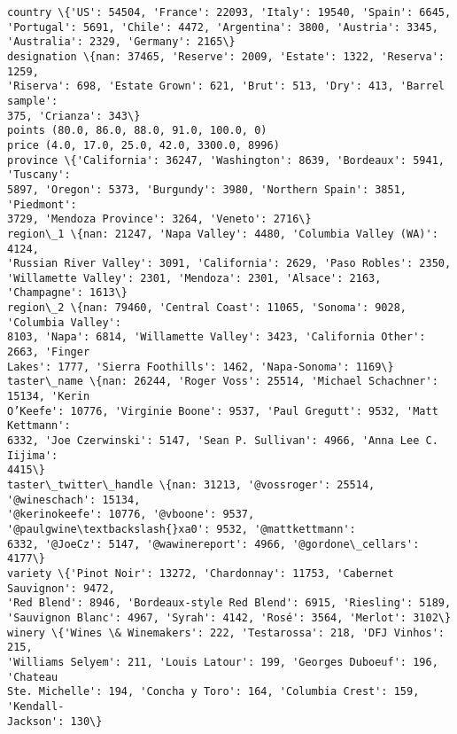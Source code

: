 \documentclass[11pt]{article}
\begin{document}
    \begin{Verbatim}[commandchars=\\\{\}]
country \{'US': 54504, 'France': 22093, 'Italy': 19540, 'Spain': 6645,
'Portugal': 5691, 'Chile': 4472, 'Argentina': 3800, 'Austria': 3345,
'Australia': 2329, 'Germany': 2165\}
designation \{nan: 37465, 'Reserve': 2009, 'Estate': 1322, 'Reserva': 1259,
'Riserva': 698, 'Estate Grown': 621, 'Brut': 513, 'Dry': 413, 'Barrel sample':
375, 'Crianza': 343\}
points (80.0, 86.0, 88.0, 91.0, 100.0, 0)
price (4.0, 17.0, 25.0, 42.0, 3300.0, 8996)
province \{'California': 36247, 'Washington': 8639, 'Bordeaux': 5941, 'Tuscany':
5897, 'Oregon': 5373, 'Burgundy': 3980, 'Northern Spain': 3851, 'Piedmont':
3729, 'Mendoza Province': 3264, 'Veneto': 2716\}
region\_1 \{nan: 21247, 'Napa Valley': 4480, 'Columbia Valley (WA)': 4124,
'Russian River Valley': 3091, 'California': 2629, 'Paso Robles': 2350,
'Willamette Valley': 2301, 'Mendoza': 2301, 'Alsace': 2163, 'Champagne': 1613\}
region\_2 \{nan: 79460, 'Central Coast': 11065, 'Sonoma': 9028, 'Columbia Valley':
8103, 'Napa': 6814, 'Willamette Valley': 3423, 'California Other': 2663, 'Finger
Lakes': 1777, 'Sierra Foothills': 1462, 'Napa-Sonoma': 1169\}
taster\_name \{nan: 26244, 'Roger Voss': 25514, 'Michael Schachner': 15134, 'Kerin
O’Keefe': 10776, 'Virginie Boone': 9537, 'Paul Gregutt': 9532, 'Matt Kettmann':
6332, 'Joe Czerwinski': 5147, 'Sean P. Sullivan': 4966, 'Anna Lee C. Iijima':
4415\}
taster\_twitter\_handle \{nan: 31213, '@vossroger': 25514, '@wineschach': 15134,
'@kerinokeefe': 10776, '@vboone': 9537, '@paulgwine\textbackslash{}xa0': 9532, '@mattkettmann':
6332, '@JoeCz': 5147, '@wawinereport': 4966, '@gordone\_cellars': 4177\}
variety \{'Pinot Noir': 13272, 'Chardonnay': 11753, 'Cabernet Sauvignon': 9472,
'Red Blend': 8946, 'Bordeaux-style Red Blend': 6915, 'Riesling': 5189,
'Sauvignon Blanc': 4967, 'Syrah': 4142, 'Rosé': 3564, 'Merlot': 3102\}
winery \{'Wines \& Winemakers': 222, 'Testarossa': 218, 'DFJ Vinhos': 215,
'Williams Selyem': 211, 'Louis Latour': 199, 'Georges Duboeuf': 196, 'Chateau
Ste. Michelle': 194, 'Concha y Toro': 164, 'Columbia Crest': 159, 'Kendall-
Jackson': 130\}
    \end{Verbatim}

    \begin{center}
    \end{center}
    { \hspace*{\fill} \\}
    
\end{document}
